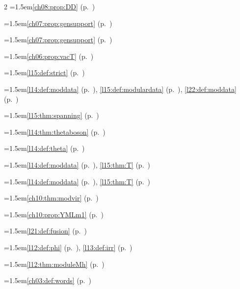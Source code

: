 \begin{multicols}{2}
\hangindent=1.5em\quad \ref{ch08:prop:DD} (p.~\pageref{ch08:prop:DD})\par
\hangindent=1.5em\quad \ref{ch07:prop:gensupport} (p.~\pageref{ch07:prop:gensupport})\par
\hangindent=1.5em\quad \ref{ch07:prop:gensupport} (p.~\pageref{ch07:prop:gensupport})\par
\hangindent=1.5em\quad \ref{ch06:prop:vacT} (p.~\pageref{ch06:prop:vacT})\par
\hangindent=1.5em\quad \ref{l15:def:strict} (p.~\pageref{l15:def:strict})\par
\hangindent=1.5em\quad \ref{l14:def:moddata} (p.~\pageref{l14:def:moddata}), \ref{l15:def:modulardata} (p.~\pageref{l15:def:modulardata}), \ref{l22:def:moddata} (p.~\pageref{l22:def:moddata})\par
\hangindent=1.5em\quad \ref{l15:thm:spanning} (p.~\pageref{l15:thm:spanning})\par
\hangindent=1.5em\quad \ref{l14:thm:thetaboson} (p.~\pageref{l14:thm:thetaboson})\par
\hangindent=1.5em\quad \ref{l14:def:theta} (p.~\pageref{l14:def:theta})\par
\hangindent=1.5em\quad \ref{l14:def:moddata} (p.~\pageref{l14:def:moddata}), \ref{l15:thm:T} (p.~\pageref{l15:thm:T})\par
\hangindent=1.5em\quad \ref{l14:def:moddata} (p.~\pageref{l14:def:moddata}), \ref{l15:thm:T} (p.~\pageref{l15:thm:T})\par
\hangindent=1.5em\quad \ref{ch10:thm:modvir} (p.~\pageref{ch10:thm:modvir})\par
\hangindent=1.5em\quad \ref{ch10:prop:YMLm1} (p.~\pageref{ch10:prop:YMLm1})\par
\hangindent=1.5em\quad \ref{l21:def:fusion} (p.~\pageref{l21:def:fusion})\par
\hangindent=1.5em\quad \ref{l12:def:phi} (p.~\pageref{l12:def:phi}), \ref{l13:def:irr} (p.~\pageref{l13:def:irr})\par
\hangindent=1.5em\quad \ref{l12:thm:moduleMh} (p.~\pageref{l12:thm:moduleMh})\par
\hangindent=1.5em\quad \ref{ch03:def:words} (p.~\pageref{ch03:def:words})\par

\end{multicols}
